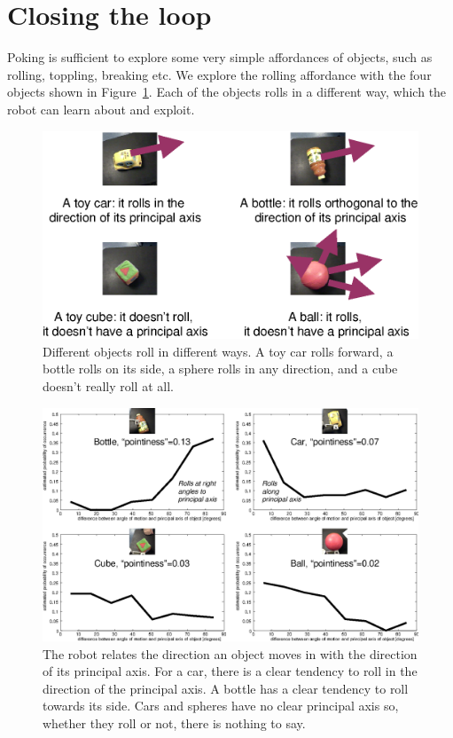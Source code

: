 
\section{Closing the loop}


Poking is sufficient to explore some very simple affordances of
objects, such as rolling, toppling, breaking etc.  We explore the
rolling affordance with the four objects shown in
Figure~\ref{fig:rolling-motivate}.  Each of the objects rolls in a
different way, which the robot can learn about and exploit.

\begin{figure}[tbh]
  \centerline{\includegraphics[width=12cm]{rolling-motivate}}
  \caption{
%
    Different objects roll in different ways.  A toy car rolls
    forward, a bottle rolls on its side, a sphere rolls in any
    direction, and a cube doesn't really roll at all.
%
} 
  \label{fig:rolling-motivate}
\end{figure}

\begin{figure}[tbh]
  \centerline{\includegraphics[width=12cm]{rolling-graphs}}
  \caption{
%
  The robot relates the direction an object moves in with the
  direction of its principal axis.  For a car, there is a clear
  tendency to roll in the direction of the principal axis.
  A bottle has a clear tendency to roll towards its side.
  Cars and spheres have no clear principal axis so, whether they
  roll or not, there is nothing to say.
%
} 
  \label{fig:rolling-graphs}
\end{figure}

